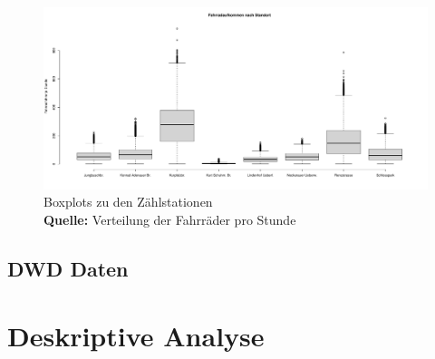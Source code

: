 \documentclass[a4paper,12pt]{thesis}
\newcommand*{\captionsource}[2]{%
	\caption[{#1}]{%
		#1%
		\\\hspace{\linewidth}%
		\textbf{Quelle:} #2%
	}%
}
\begin{document}
\begin{figure}[!ht]
	\centering
	\includegraphics[width=\textwidth]{Plots/Boxplot_Stationen.pdf}
	\captionsource{Boxplots zu den Zählstationen}{
		Verteilung der Fahrräder pro Stunde
	}
	\label{fig:meine-grafik5}
\end{figure}

\section{DWD Daten}


\chapter{Deskriptive Analyse}
\end{document}
